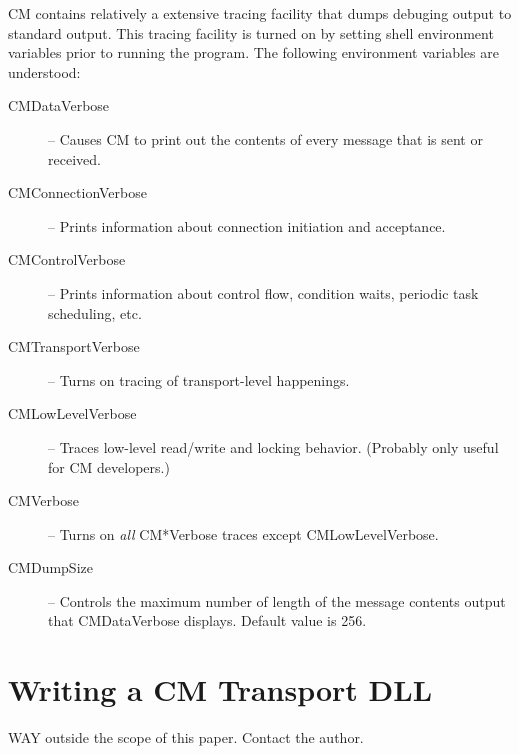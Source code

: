 \documentclass[11pt]{article}
\begin{document}
CM contains relatively a extensive tracing facility that dumps debuging
output to standard output.  This tracing facility is turned on by setting
shell environment variables prior to running the program.  The following
environment variables are understood:
\begin{description}
\item[CMDataVerbose] -- Causes CM to print out the contents of every message
that is sent or received.
\item[CMConnectionVerbose] -- Prints information about connection initiation
and acceptance.
\item[CMControlVerbose] -- Prints information about control flow, condition
waits, periodic task scheduling, etc.
\item[CMTransportVerbose] -- Turns on tracing of transport-level happenings.
\item[CMLowLevelVerbose] -- Traces low-level read/write and locking
behavior.  (Probably only useful for CM developers.)
\item[CMVerbose] -- Turns on {\em all} CM*Verbose traces except
CMLowLevelVerbose.
\item[CMDumpSize] -- Controls the maximum number of length of the message
contents output that CMDataVerbose displays.  Default value is 256.
\end{description}

\section{Writing a CM Transport DLL}
WAY outside the scope of this paper.  Contact the author.

\end{document}
